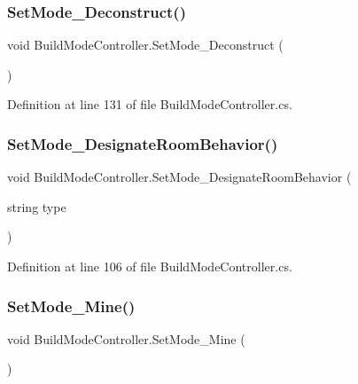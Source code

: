 \subsubsection{\texorpdfstring{Set\+Mode\+\_\+\+Deconstruct()}{SetMode\_Deconstruct()}}
{\footnotesize\ttfamily void Build\+Mode\+Controller.\+Set\+Mode\+\_\+\+Deconstruct (\begin{DoxyParamCaption}{ }\end{DoxyParamCaption})}



Definition at line 131 of file Build\+Mode\+Controller.\+cs.

\mbox{\label{class_build_mode_controller_a3efe18c3fb374c2acc5f389486f10f90}} 
\subsubsection{\texorpdfstring{Set\+Mode\+\_\+\+Designate\+Room\+Behavior()}{SetMode\_DesignateRoomBehavior()}}
{\footnotesize\ttfamily void Build\+Mode\+Controller.\+Set\+Mode\+\_\+\+Designate\+Room\+Behavior (\begin{DoxyParamCaption}\item[{string}]{type }\end{DoxyParamCaption})}



Definition at line 106 of file Build\+Mode\+Controller.\+cs.

\mbox{\label{class_build_mode_controller_a895c0c5021e532b32fdc28d9c8c45c1b}} 
\subsubsection{\texorpdfstring{Set\+Mode\+\_\+\+Mine()}{SetMode\_Mine()}}
{\footnotesize\ttfamily void Build\+Mode\+Controller.\+Set\+Mode\+\_\+\+Mine (\begin{DoxyParamCaption}{ }\end{DoxyParamCaption})}



